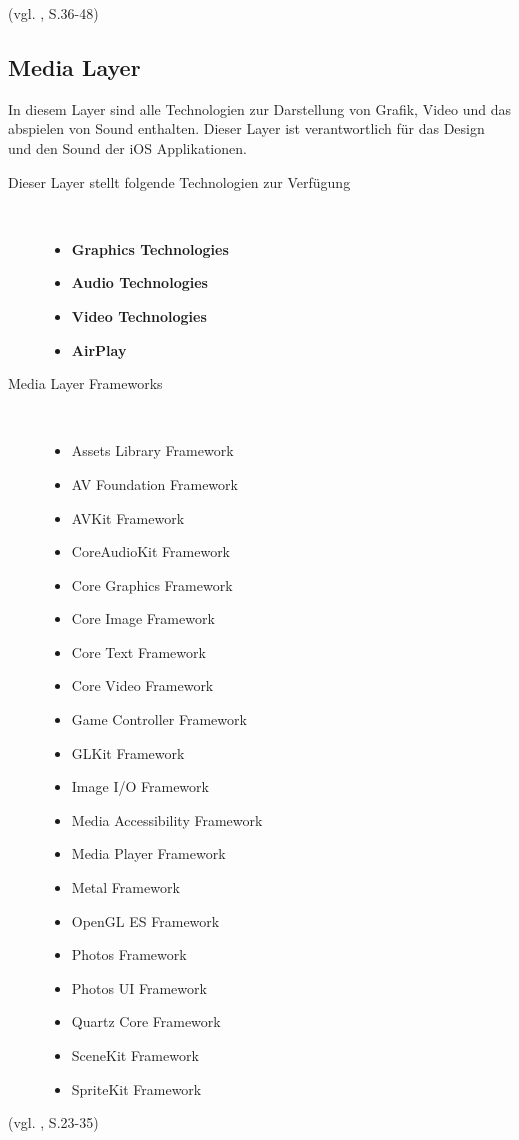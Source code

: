 (vgl. \cite{Apple[6]}, S.36-48)
\subsection{Media Layer}
\label{sec:MediaLayer}		
In diesem Layer sind alle Technologien zur Darstellung von Grafik, Video und das abspielen von Sound enthalten. Dieser Layer ist verantwortlich für das Design und den Sound der iOS Applikationen. 

\begin{description}
	\item[Dieser Layer stellt folgende Technologien zur Verfügung]~\par
    \begin{itemize}
		\item \textbf{Graphics Technologies}
		\item \textbf{Audio Technologies}
		\item \textbf{Video Technologies}
		\item \textbf{AirPlay}
    \end{itemize}

	\item[Media Layer Frameworks]~\par
	\begin{multicols}{2}
	\begin{itemize}
		\item Assets Library Framework
		\item AV Foundation Framework
		\item AVKit Framework
		\item CoreAudioKit Framework
		\item Core Graphics Framework
		\item Core Image Framework
		\item Core Text Framework
		\item Core Video Framework
		\item Game Controller Framework
		\item GLKit Framework
		\item Image I/O Framework
		\item Media Accessibility Framework
		\item Media Player Framework
		\item Metal Framework
		\item OpenGL ES Framework
		\item Photos Framework
		\item Photos UI Framework
		\item Quartz Core Framework
		\item SceneKit Framework
		\item SpriteKit Framework
         \end{itemize}
	\end{multicols}
\end{description}
(vgl. \cite{Apple[6]}, S.23-35)
